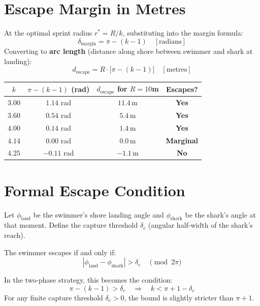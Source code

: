 \documentclass[12pt, a4paper]{article}
\theoremstyle{definition}
\newcommand{\abs}[1]{\left|#1\right|}
\begin{document}
\section{Escape Margin in Metres}

At the optimal sprint radius $r^* = R/k$, substituting into the margin formula:
\[
  \delta_{\text{margin}} = \pi - (k - 1) \quad [\text{radians}]
\]
Converting to \textbf{arc length} (distance along shore between swimmer and shark at landing):
\[
  \boxed{
    d_{\text{escape}} = R \cdot \bigl[\pi - (k-1)\bigr] \quad [\text{metres}]
  }
\]

\begin{center}
\renewcommand{\arraystretch}{1.4}
\begin{tabular}{cccc}
  \toprule
  $k$ & $\pi - (k-1)$ (rad) & $d_{\text{escape}}$ for $R=10$m & Escapes? \\
  \midrule
  $3.00$ & $1.14$ rad & $11.4\,\text{m}$ & \textcolor{swimcolor}{\textbf{Yes}} \\
  $3.60$ & $0.54$ rad & $5.4\,\text{m}$  & \textcolor{swimcolor}{\textbf{Yes}} \\
  $4.00$ & $0.14$ rad & $1.4\,\text{m}$  & \textcolor{swimcolor}{\textbf{Yes}} \\
  $4.14$ & $0.00$ rad & $0.0\,\text{m}$  & \textcolor{orbitcolor}{\textbf{Marginal}} \\
  $4.25$ & $-0.11$ rad & $-1.1\,\text{m}$ & \textcolor{sharkcolor}{\textbf{No}} \\
  \bottomrule
\end{tabular}
\end{center}

\vspace{0.5em}

\section{Formal Escape Condition}

Let $\phi_{\text{land}}$ be the swimmer's shore landing angle and $\phi_{\text{shark}}$ be the shark's angle at that moment. Define the capture threshold $\delta_c$ (angular half-width of the shark's reach).

The swimmer escapes if and only if:
\[
  \abs{\phi_{\text{land}} - \phi_{\text{shark}}} > \delta_c
  \quad\pmod{2\pi}
\]

In the two-phase strategy, this becomes the condition:
\[
  \pi - (k-1) > \delta_c
  \quad\Longrightarrow\quad
  k < \pi + 1 - \delta_c
\]
For any finite capture threshold $\delta_c > 0$, the bound is slightly stricter than $\pi + 1$.
\end{document}

